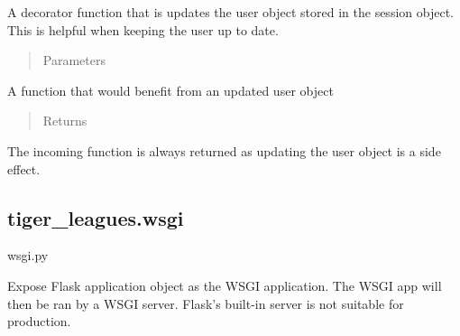 \documentclass[letterpaper,10pt,english]{sphinxmanual}
\begin{document}

\begin{fulllineitems}
\label{\detokenize{tiger_leagues/readme:tiger_leagues.decorators.refresh_user_profile}}
A decorator function that is updates the user object stored in the session 
object. This is helpful when keeping the user up to date.

\begin{quote}\begin{description}
\item[{Parameters}] \leavevmode
{} \textendash{} 

\end{description}\end{quote}

A function that would benefit from an updated user object
\begin{quote}\begin{description}
\item[{Returns}] \leavevmode
{}

\end{description}\end{quote}

The incoming function is always returned as updating the user object is a 
side effect.

\end{fulllineitems}



\subsection{tiger\_leagues.wsgi}
\label{\detokenize{tiger_leagues/readme:module-tiger_leagues.wsgi}}\label{\detokenize{tiger_leagues/readme:tiger-leagues-wsgi}}
wsgi.py

Expose Flask application object as the WSGI application. The WSGI app will then
be ran by a WSGI server. Flask’s built-in server is not suitable for production.
\end{document}
